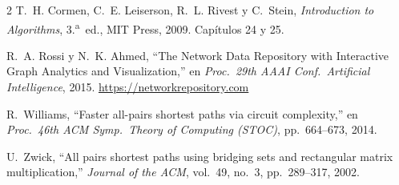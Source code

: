 \documentclass[11pt]{article}
\begin{document}
\begin{thebibliography}{2}
 T.~H. Cormen, C.~E. Leiserson, R.~L. Rivest y C.~Stein,
\emph{Introduction to Algorithms}, 3.\textsuperscript{a}~ed., MIT Press,
2009. Capítulos 24 y 25.

R.~A. Rossi y N.~K. Ahmed, ``The Network Data Repository with Interactive
Graph Analytics and Visualization,'' en \emph{Proc.\ 29th AAAI Conf.\
Artificial Intelligence}, 2015. \url{https://networkrepository.com}

R.~Williams, ``Faster all-pairs shortest paths via circuit complexity,''
en \emph{Proc.\ 46th ACM Symp.\ Theory of Computing (STOC)}, pp.~664--673,
2014.

U.~Zwick, ``All pairs shortest paths using bridging sets and rectangular
matrix multiplication,'' \emph{Journal of the ACM}, vol.~49, no.~3,
pp.~289--317, 2002.
\end{thebibliography}
\end{document}
